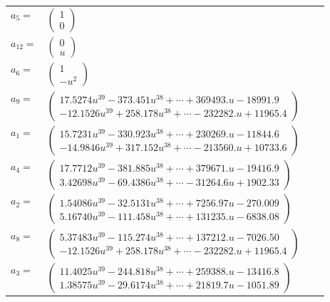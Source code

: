 \documentclass[1p]{elsarticle_modified}
\theoremstyle{definition}
\begin{document}
\begin{tabular}{m{7pt} m{180pt} m{7pt} m{180pt} }
\flushright $a_{5}=$&$\begin{pmatrix}1\\0\end{pmatrix}$ \\
\flushright $a_{12}=$&$\begin{pmatrix}0\\u\end{pmatrix}$ \\
\flushright $a_{6}=$&$\begin{pmatrix}1\\- u^2\end{pmatrix}$ \\
\flushright $a_{9}=$&$\begin{pmatrix}17.5274 u^{39}-373.451 u^{38}+\cdots+369493. u-18991.9\\-12.1526 u^{39}+258.178 u^{38}+\cdots-232282. u+11965.4\end{pmatrix}$ \\
\flushright $a_{1}=$&$\begin{pmatrix}15.7231 u^{39}-330.923 u^{38}+\cdots+230269. u-11844.6\\-14.9846 u^{39}+317.152 u^{38}+\cdots-213560. u+10733.6\end{pmatrix}$ \\
\flushright $a_{4}=$&$\begin{pmatrix}17.7712 u^{39}-381.885 u^{38}+\cdots+379671. u-19416.9\\3.42698 u^{39}-69.4386 u^{38}+\cdots-31264.6 u+1902.33\end{pmatrix}$ \\
\flushright $a_{2}=$&$\begin{pmatrix}1.54086 u^{39}-32.5131 u^{38}+\cdots+7256.97 u-270.009\\5.16740 u^{39}-111.458 u^{38}+\cdots+131235. u-6838.08\end{pmatrix}$ \\
\flushright $a_{8}=$&$\begin{pmatrix}5.37483 u^{39}-115.274 u^{38}+\cdots+137212. u-7026.50\\-12.1526 u^{39}+258.178 u^{38}+\cdots-232282. u+11965.4\end{pmatrix}$ \\
\flushright $a_{3}=$&$\begin{pmatrix}11.4025 u^{39}-244.818 u^{38}+\cdots+259388. u-13416.8\\1.38575 u^{39}-29.6174 u^{38}+\cdots+21819.7 u-1051.89\end{pmatrix}$ \\

\end{tabular}
\end{document}
